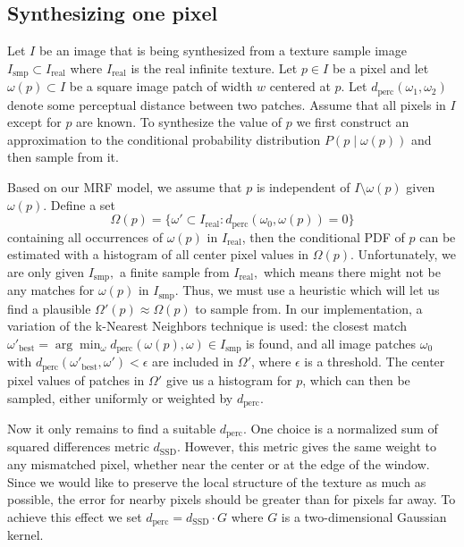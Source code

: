 \documentclass{article}
\begin{document}
\subsection{Synthesizing one pixel}
Let \( I \) be an image that is being synthesized from a texture sample image \( I_{\text{smp}} \subset I_{\text{real}} \) where \( I_{\text{real}} \) is the real infinite texture. Let \( p \in I \) be a pixel and let \( \omega(p) \subset I \) be a square image patch of width \( w \) centered at \( p \). Let \( d_{\text{perc}}(\omega_1, \omega_2) \) denote some perceptual distance between two patches. Assume that all pixels in \( I \) except for \( p \) are known. To synthesize the value of \( p \) we first construct an approximation to the conditional probability distribution \( P(p \mid \omega(p)) \) and then sample from it.

Based on our MRF model, we assume that \( p \) is independent of \( I \setminus \omega(p) \) given \( \omega(p) \). Define a set
\[
\Omega(p) = \{\omega' \subset I_{\text{real}} : d_{\text{perc}}(\omega_0, \omega(p)) = 0\}
\]
containing all occurrences of \( \omega(p) \) in \( I_{\text{real}} \), then the conditional PDF of \( p \) can be estimated with a histogram of all center pixel values in \( \Omega(p) \). Unfortunately, we are only given \( I_{\text{smp}}, \) a finite sample from \( I_{\text{real}}, \) which means there might not be any matches for \( \omega(p) \) in \( I_{\text{smp}} \). Thus, we must use a heuristic which will let us find a plausible \( \Omega'(p) \approx \Omega(p) \) to sample from. In our implementation, a variation of the k-Nearest Neighbors technique is used: the closest match \( \omega'_{\text{best}} = \arg\min_{\omega} d_{\text{perc}}(\omega(p), \omega) \in I_{\text{smp}} \) is found, and all image patches \( \omega_0 \) with \( d_{\text{perc}}(\omega'_{\text{best}}, \omega') < \epsilon \) are included in \( \Omega' \), where \( \epsilon \) is a threshold. The center pixel values of patches in \( \Omega' \) give us a histogram for \( p \), which can then be sampled, either uniformly or weighted by \( d_{\text{perc}} \).

Now it only remains to find a suitable \( d_{\text{perc}} \). One choice is a normalized sum of squared differences metric \( d_{\text{SSD}} \). However, this metric gives the same weight to any mismatched pixel, whether near the center or at the edge of the window. Since we would like to preserve the local structure of the texture as much as possible, the error for nearby pixels should be greater than for pixels far away. To achieve this effect we set \( d_{\text{perc}} = d_{\text{SSD}} \cdot G \) where \( G \) is a two-dimensional Gaussian kernel.
\end{document}
